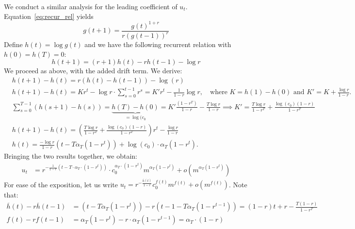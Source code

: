 \documentclass[nonblindrev]{informs3noheader}
\begin{document}
We conduct a similar analysis for the leading coefficient of $u_t$. Equation~\eqref{eq:recur_rel} yields
\[g(t+1) = \frac{g(t)^{1+r}}{r(g(t-1))^r}\]
Define $h(t)=\log g(t)$ and we have the following recurrent relation with $h(0)=h(T)=0$:
\[h(t+1) = (r+1)h(t)-rh(t-1)-\log r\]
We proceed as above, with the added drift term. We derive:
\begin{align*}
    & h(t+1)-h(t) = r\left(h(t)-h(t-1)\right)-\log(r)\\
    & h(t+1)-h(t)=Kr^t-\log r\cdot\sum_{s=0}^{t-1}r^s=K'r^t-\frac{1}{1-r}\log r,\quad\text{where $K=h(1)-h(0)$ and $K'=K+\frac{\log r}{1-r}$.}\\
    & \sum_{s=0}^{T-1}(h(s+1)-h(s))=\underbrace{h(T)-h(0)}_{=\log(c_0}=K'\frac{\left(1-r^T\right)}{1-r}-\frac{T\log r}{1-r}\implies K'=\frac{T\log r}{1-r^T} + \frac{\log(c_0)(1-r)}{1-r^T}\\
    & h(t+1)-h(t)=\left(\frac{T\log r}{1-r^T} + \frac{\log(c_0)(1-r)}{1-r^T}\right)r^t -\frac{\log r}{1-r} \\
    & h(t)=\frac{-\log r}{1-r}\left(t-T\alpha_T(1-r^t)\right)+\log(c_0)\cdot\alpha_T(1-r^t).
\end{align*}
Bringing the two results together, we obtain:
\begin{align*}
    u_t&=r^{-\frac{1}{1-r}\left(t-T\cdot\alpha_T\cdot(1-r^t)\right)}\cdot c_0^{\alpha_T\cdot(1-r^t)}m^{\alpha_T\left(1-r^t\right)}+o\left(m^{\alpha_T\left(1-r^t\right)}\right)
\end{align*}
For ease of the exposition, let us write $u_t=r^{-\frac{\overline{h}(t)}{1-r}}c_0^{f(t)}m^{f(t)} + o\left(m^{f(t)}\right)$. Note that:
\begin{align}
    \overline{h}(t)-r\overline{h}(t-1)&=\left(t-T\alpha_T(1-r^t)\right)-r\left(t-1-T\alpha_T(1-r^{t-1})\right)
    =(1-r)t+r-\frac{T(1-r)}{1-r^T}\label{eq:hbar_rec}\\
    f(t)-rf(t-1)&=\alpha_T(1-r^t)-r\cdot\alpha_T(1-r^{t-1})
    =\alpha_T\cdot(1-r)\label{eq:alpha_rec}
\end{align}
\end{document}
